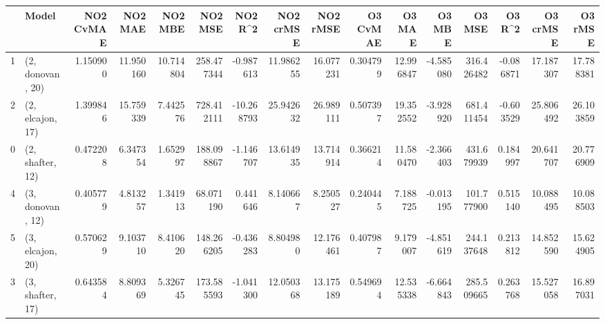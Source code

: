\begin{tabular}{llrrrrrrrrrrrrrr}
\toprule
{} &             Model &  NO2 CvMAE &    NO2 MAE &    NO2 MBE &     NO2 MSE &    NO2 R\textasciicircum2 &  NO2 crMSE &   NO2 rMSE &  O3 CvMAE &     O3 MAE &    O3 MBE &      O3 MSE &    O3 R\textasciicircum2 &   O3 crMSE &    O3 rMSE \\
\midrule
1 &  (2, donovan, 20) &   1.150900 &  11.950160 &  10.714804 &  258.477344 &  -0.987613 &  11.986255 &  16.077231 &  0.304799 &  12.996847 & -4.585080 &  316.426482 & -0.086871 &  17.187307 &  17.788381 \\
2 &  (2, elcajon, 17) &   1.399846 &  15.759339 &   7.442576 &  728.412111 & -10.268793 &  25.942632 &  26.989111 &  0.507397 &  19.352552 & -3.928920 &  681.411454 & -0.603529 &  25.806492 &  26.103859 \\
0 &  (2, shafter, 12) &   0.472208 &   6.347354 &   1.652997 &  188.098867 &  -1.146707 &  13.614935 &  13.714914 &  0.366214 &  11.580470 & -2.366403 &  431.679939 &  0.184997 &  20.641707 &  20.776909 \\
4 &  (3, donovan, 12) &   0.405779 &   4.813257 &   1.341913 &   68.071190 &   0.441646 &   8.140667 &   8.250527 &  0.240445 &   7.188725 & -0.013195 &  101.777900 &  0.515140 &  10.088495 &  10.088503 \\
5 &  (3, elcajon, 20) &   0.570629 &   9.103710 &   8.410620 &  148.266205 &  -0.436283 &   8.804980 &  12.176461 &  0.407987 &   9.179007 & -4.851619 &  244.137648 &  0.213812 &  14.852590 &  15.624905 \\
3 &  (3, shafter, 17) &   0.643584 &   8.809369 &   5.326745 &  173.585593 &  -1.041300 &  12.050368 &  13.175189 &  0.549694 &  12.535338 & -6.664843 &  285.509665 &  0.263768 &  15.527058 &  16.897031 \\
\bottomrule
\end{tabular}

